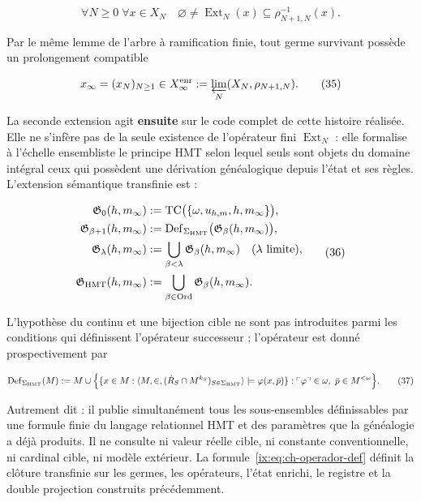 \[
 \forall N\ge0\;\forall x\in X_N\quad
 \varnothing\ne\operatorname{Ext}_N(x)
 \subseteq\rho_{N+1,N}^{-1}(x).
\tag{34}\label{ix:eq:ch-extension-no-vacia}
\]

Par le même lemme de l’arbre à ramification finie, tout germe survivant
possède un prolongement compatible

\[
 x_\infty=(x_N)_{N\ge1}\in
 X_\infty^{\rm enr}:=\varprojlim_N(X_N,\rho_{N+1,N}).
\tag{35}\label{ix:eq:ch-limite-inverso}
\]

La seconde extension agit \textbf{ensuite} sur le code complet de cette
histoire réalisée.
Elle ne s’infère pas de la seule existence de l’opérateur fini
\(\operatorname{Ext}_N\) : elle formalise à l’échelle ensembliste le principe HMT selon
lequel seuls sont objets du domaine intégral ceux qui possèdent une dérivation
généalogique depuis l’état et ses règles. L’extension sémantique transfinie
est :

\[
 \begin{aligned}
  \mathfrak G_0(h,m_\infty)
  &:=\operatorname{TC}\bigl(\{\omega,u_{h,m},h,m_\infty\}\bigr),\\
  \mathfrak G_{\beta+1}(h,m_\infty)
  &:=\operatorname{Def}_{\Sigma_{\rm HMT}}
       \bigl(\mathfrak G_\beta(h,m_\infty)\bigr),\\
  \mathfrak G_\lambda(h,m_\infty)
  &:=\bigcup_{\beta<\lambda}\mathfrak G_\beta(h,m_\infty)
       \quad(\lambda\text{ limite}),\\
  \mathfrak G_{\rm HMT}(h,m_\infty)
  &:=\bigcup_{\beta\in\operatorname{Ord}}
       \mathfrak G_\beta(h,m_\infty).
 \end{aligned}
\tag{36}\label{ix:eq:ch-clausura-transfinita}
\]

L'hypothèse du continu et une bijection cible ne sont pas introduites parmi les conditions qui définissent l'opérateur successeur ; l'opérateur est donné prospectivement par

\[
 \operatorname{Def}_{\Sigma_{\rm HMT}}(M)
 :=M\cup
 \Bigl\{
   \{x\in M:\langle M,\in,
       (\dot R_S\cap M^{k_S})_{S\in\Sigma_{\rm HMT}}\rangle
       \models\varphi(x,\bar p)\}:
   \ulcorner\varphi\urcorner\in\omega,
   \ \bar p\in M^{<\omega}
 \Bigr\}.
\tag{37}\label{ix:eq:ch-operador-def}
\]

Autrement dit : il publie simultanément tous les sous-ensembles définissables par une formule finie du langage relationnel HMT et des paramètres que la généalogie a déjà produits. Il ne consulte ni valeur réelle cible, ni constante conventionnelle, ni cardinal cible, ni modèle extérieur. La formule~\eqref{ix:eq:ch-operador-def} définit la clôture transfinie sur les germes, les opérateurs, l'état enrichi, le registre et la double projection construits précédemment.


